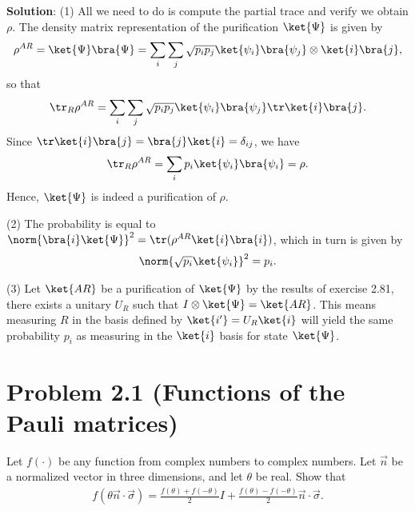 \documentclass{book}
\begin{document}
    \textbf{Solution}: (1) All we need to do is compute the partial trace and verify we obtain $\rho$. The density matrix representation of the purification $\ket{\Psi}$ is given by
    \begin{align}
        \rho^{AR} = \ket{\Psi}\bra{\Psi} = \sum_i \sum_j \sqrt{p_i p_j} \ket{\psi_i}\bra{\psi_j} \otimes \ket{i}\bra{j},
    \end{align}
    so that 
    \begin{align}
        \tr_R \rho^{AR} = \sum_i \sum_j \sqrt{p_i p_j} \ket{\psi_i}\bra{\psi_j} \tr \ket{i}\bra{j}.
    \end{align}
    Since $\tr \ket{i}\bra{j} = \bra{j}\ket{i} = \delta_{ij}$, we have
    \begin{align}
        \tr_R \rho^{AR} = \sum_i p_i \ket{\psi_i}\bra{\psi_i} = \rho.
    \end{align}
    Hence, $\ket{\Psi}$ is indeed a purification of $\rho$.

    (2) The probability is equal to $\norm{\bra{i} \ket{\Psi}}^2 = \tr (\rho^{AR} \ket{i}\bra{i})$, which in turn is given by
    \begin{align}
        \norm{\sqrt{p_i} \ket{\psi_i}}^2 = p_i.
    \end{align}

    (3) Let $\ket{AR}$ be a purification of $\ket{\Psi}$ by the results of exercise 2.81, there exists a unitary $U_R$ such that $I \otimes \ket{\Psi} = \ket{AR}$. This means measuring $R$ in the basis defined by $\ket{i'} = U_R \ket{i}$ will yield the same probability $p_i$ as measuring in the $\ket{i}$ basis for state $\ket{\Psi}$.

\section*{Problem 2.1 (Functions of the Pauli matrices)}
    Let $f(\cdot)$ be any function from complex numbers to complex numbers. Let $\vec{n}$ be a normalized vector in three dimensions, and let $\theta$ be real. Show that
    \begin{align}
        f(\theta \vec{n} \cdot \vec{\sigma}) = \frac{f(\theta) + f(-\theta)}{2} I + \frac{f(\theta)- f(-\theta)}{2} \vec{n} \cdot \vec{\sigma}.
    \end{align}
\end{document}
